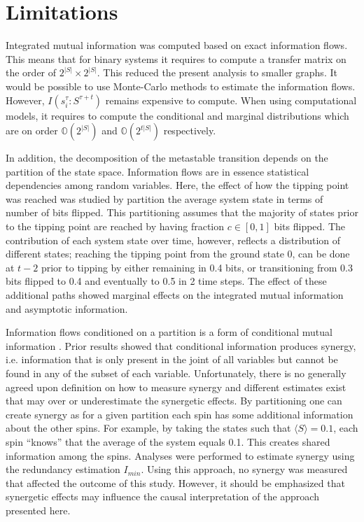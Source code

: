 \documentclass[a4paper, 11pt, twocolumn]{article}
\begin{document}
\section{Limitations}
\label{sec:org26f073f}
Integrated mutual  information was  computed based  on exact
information  flows. This  means that  for binary  systems it
requires  to  compute a  transfer  matrix  on the  order  of
\(2^{|S|} \times 2^{|S|}\). This  reduced the present analysis to
smaller  graphs. It  would  be possible  to use  Monte-Carlo
methods   to  estimate   the  information   flows.  However,
\(I(s_i^{\tau}  : S^{\tau  + t})\)  remains expensive  to compute.
When using computational models,  it requires to compute the
conditional and  marginal distributions  which are  on order
\(\mathbb{O}(2^{|S|})\)       and       \(\mathbb{O}(2^{t|S|})\)
respectively.

In addition, the decomposition  of the metastable transition
depends  on the  partition of  the state  space. Information
flows are  in essence statistical dependencies  among random
variables. Here,  the effect  of how  the tipping  point was
reached was studied by partition the average system state in
terms of  number of bits flipped.  This partitioning assumes
that the majority  of states prior to the  tipping point are
reached by having fraction \(c  \in [0, 1]\) bits flipped. The
contribution  of  each  system  state  over  time,  however,
reflects a  distribution of  different states;  reaching the
tipping  point from  the  ground  state 0,  can  be done  at
\(t-2\) prior to tipping by either remaining in 0.4 bits, or
transitioning from 0.3 bits flipped to 0.4 and eventually to
0.5 in  2 time steps.  The effect of these  additional paths
showed marginal effects on the integrated mutual information
and asymptotic information.

Information flows  conditioned on a  partition is a  form of
conditional   mutual   information  \cite{James2016a}.   Prior
results   showed  that   conditional  information   produces
synergy, i.e. information that is  only present in the joint
of all variables but cannot be found in any of the subset of
each variable.  Unfortunately, there is no  generally agreed
upon    definition    on     how    to    measure    synergy
\cite{Beer2015,Kolchinsky2022}  and different  estimates exist
that may  over or  underestimate the synergetic  effects. By
partitioning one can create synergy as for a given partition
each spin  has some  additional information about  the other
spins. For example, by taking the states such that \(\langle S \rangle =
0.1\),  each spin  ``knows'' that  the average  of the  system
equals 0.1. This creates shared information among the spins.
Analyses  were  performed  to  estimate  synergy  using  the
redundancy  estimation  \(I_{min}\)\cite{Williams2010}.  Using
this  approach, no  synergy was  measured that  affected the
outcome of this study. However, it should be emphasized that
synergetic effects  may influence the  causal interpretation
of the approach presented here.
\end{document}
